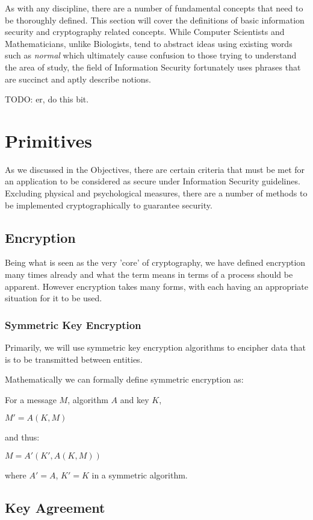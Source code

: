 As with any discipline, there are a number of fundamental concepts that need to be thoroughly defined. This section will cover the definitions of basic information security and cryptography related concepts. While Computer Scientists and Mathematicians, unlike Biologists, tend to abstract ideas using existing words such as \emph{normal} which ultimately cause confusion to those trying to understand the area of study, the field of Information Security fortunately uses phrases that are succinct and aptly describe notions.

TODO: er, do this bit.

\section{Primitives}

As we discussed in the Objectives, there are certain criteria that must be met for an application to be considered as secure under Information Security guidelines. Excluding physical and psychological measures, there are a number of methods to be implemented cryptographically to guarantee security.

\subsection{Encryption}

Being what is seen as the very 'core' of cryptography, we have defined encryption many times already and what the term means in terms of a process should be apparent. However encryption takes many forms, with each having an appropriate situation for it to be used.

\subsubsection{Symmetric Key Encryption}

Primarily, we will use symmetric key encryption algorithms to encipher data that is to be transmitted between entities.

Mathematically we can formally define symmetric encryption as:

For a message $M$, algorithm $A$ and key $K$,

$M'  = A(K,M)$

and thus:

$M = A'(K',A(K,M))$

where $A' = A$, $K' = K$ in a symmetric algorithm.

\subsection{Key Agreement}

